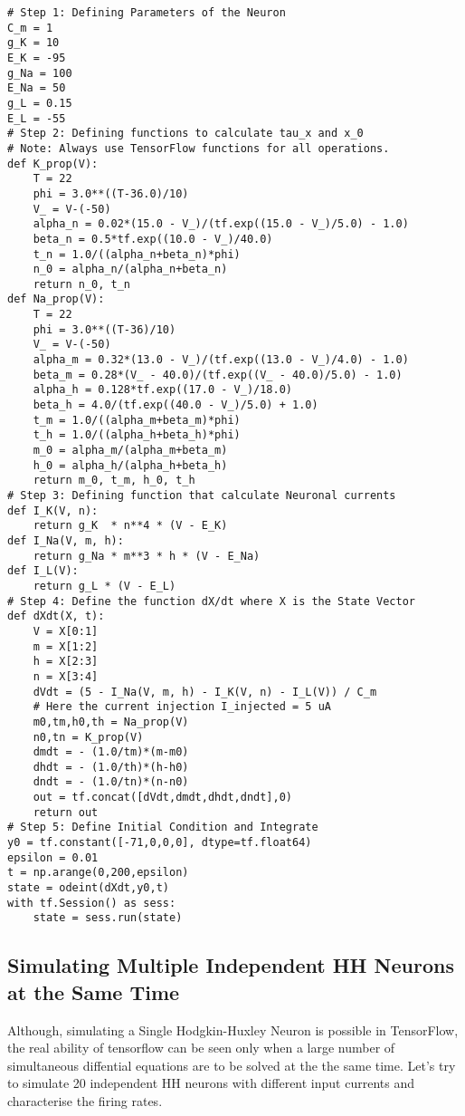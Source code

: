 \documentclass[10pt,letterpaper]{article}
\begin{document}
\begin{verbatim}
# Step 1: Defining Parameters of the Neuron 
C_m = 1
g_K = 10
E_K = -95
g_Na = 100
E_Na = 50 
g_L = 0.15
E_L = -55
# Step 2: Defining functions to calculate tau_x and x_0
# Note: Always use TensorFlow functions for all operations.
def K_prop(V):
    T = 22
    phi = 3.0**((T-36.0)/10)
    V_ = V-(-50)
    alpha_n = 0.02*(15.0 - V_)/(tf.exp((15.0 - V_)/5.0) - 1.0)
    beta_n = 0.5*tf.exp((10.0 - V_)/40.0) 
    t_n = 1.0/((alpha_n+beta_n)*phi)
    n_0 = alpha_n/(alpha_n+beta_n)
    return n_0, t_n
def Na_prop(V):
    T = 22
    phi = 3.0**((T-36)/10)
    V_ = V-(-50)
    alpha_m = 0.32*(13.0 - V_)/(tf.exp((13.0 - V_)/4.0) - 1.0)
    beta_m = 0.28*(V_ - 40.0)/(tf.exp((V_ - 40.0)/5.0) - 1.0)
    alpha_h = 0.128*tf.exp((17.0 - V_)/18.0)
    beta_h = 4.0/(tf.exp((40.0 - V_)/5.0) + 1.0)
    t_m = 1.0/((alpha_m+beta_m)*phi)
    t_h = 1.0/((alpha_h+beta_h)*phi)
    m_0 = alpha_m/(alpha_m+beta_m)
    h_0 = alpha_h/(alpha_h+beta_h)
    return m_0, t_m, h_0, t_h
# Step 3: Defining function that calculate Neuronal currents
def I_K(V, n):
    return g_K  * n**4 * (V - E_K)
def I_Na(V, m, h):
    return g_Na * m**3 * h * (V - E_Na)
def I_L(V):
    return g_L * (V - E_L)
# Step 4: Define the function dX/dt where X is the State Vector
def dXdt(X, t):
    V = X[0:1]
    m = X[1:2]
    h = X[2:3]
    n = X[3:4]
    dVdt = (5 - I_Na(V, m, h) - I_K(V, n) - I_L(V)) / C_m 
    # Here the current injection I_injected = 5 uA
    m0,tm,h0,th = Na_prop(V)
    n0,tn = K_prop(V)
    dmdt = - (1.0/tm)*(m-m0)
    dhdt = - (1.0/th)*(h-h0)
    dndt = - (1.0/tn)*(n-n0)
    out = tf.concat([dVdt,dmdt,dhdt,dndt],0)
    return out
# Step 5: Define Initial Condition and Integrate
y0 = tf.constant([-71,0,0,0], dtype=tf.float64)
epsilon = 0.01
t = np.arange(0,200,epsilon)
state = odeint(dXdt,y0,t)
with tf.Session() as sess:
    state = sess.run(state)
\end{verbatim}

\subsection*{Simulating Multiple Independent HH Neurons at the Same Time}

Although, simulating a Single Hodgkin-Huxley Neuron is possible in TensorFlow, the real ability of tensorflow can be seen only when a large number of simultaneous diffential equations are to be solved at the the same time. Let's try to simulate 20 independent HH neurons with different input currents and characterise the firing rates. 
\end{document}
